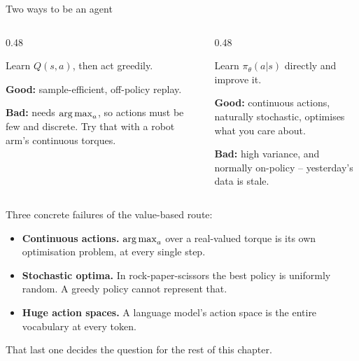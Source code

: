 \documentclass[aspectratio=169]{beamer}
\begin{document}
\begin{frame}{Two ways to be an agent}
  \begin{columns}[T]
    \begin{column}{0.48\textwidth}
      \begin{tcolorbox}[colback=armblue!8, colframe=armblue, boxrule=0.6pt, arc=2pt,
                        title={\textbf{Value-based}}]
        \small
        Learn $Q(s,a)$, then act greedily.

        \vskip 4pt
        \textbf{Good:} sample-efficient, off-policy replay.

        \vskip 2pt
        \textbf{Bad:} needs $\mathop{\mathrm{arg\,max}}_a$, so actions must be few and discrete. Try that with a
        robot arm's continuous torques.
      \end{tcolorbox}
    \end{column}
    \begin{column}{0.48\textwidth}
      \begin{tcolorbox}[colback=paramgreen!8, colframe=paramgreen, boxrule=0.6pt, arc=2pt,
                        title={\textbf{Policy-based}}]
        \small
        Learn $\pi_\theta(a|s)$ directly and improve it.

        \vskip 4pt
        \textbf{Good:} continuous actions, naturally stochastic, optimises what you care about.

        \vskip 2pt
        \textbf{Bad:} high variance, and normally on-policy -- yesterday's data is stale.
      \end{tcolorbox}
    \end{column}
  \end{columns}

  \vskip 8pt
  \small
  Three concrete failures of the value-based route:

  \begin{itemize}\itemsep2pt
    \item \textbf{Continuous actions.} $\mathop{\mathrm{arg\,max}}_a$ over a real-valued torque is its own
          optimisation problem, at every single step.
    \item \textbf{Stochastic optima.} In rock-paper-scissors the best policy is uniformly
          random. A greedy policy cannot represent that.
    \item \textbf{Huge action spaces.} A language model's action space is the entire vocabulary
          at every token.
  \end{itemize}

  \vskip 4pt
  \begin{center}
    \small
    That last one decides the question for the rest of this chapter.
  \end{center}
\end{frame}
\end{document}
